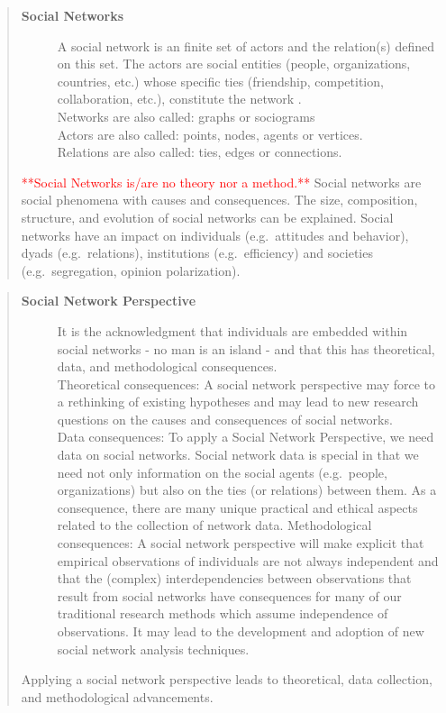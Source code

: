 \documentclass[
]{book}
\begin{document}
\begin{quote}
\begin{description}
\item[\textbf{Social Networks}]
A social network is an finite set of actors and the relation(s) defined on this set. The actors are social entities (people, organizations, countries, etc.) whose specific ties (friendship, competition, collaboration, etc.), constitute the network \citep[ : 20]{Wasserman1994}.\\
Networks are also called: graphs or sociograms\\
Actors are also called: points, nodes, agents or vertices.\\
Relations are also called: ties, edges or connections.
\end{description}

\textcolor{red}{**Social Networks is/are no theory nor a method.**} Social networks are social phenomena with causes and consequences. The size, composition, structure, and evolution of social networks can be explained. Social networks have an impact on individuals (e.g.~attitudes and behavior), dyads (e.g.~relations), institutions (e.g.~efficiency) and societies (e.g.~segregation, opinion polarization).
\end{quote}

\begin{quote}
\begin{description}
\item[\textbf{Social Network Perspective}]
It is the acknowledgment that individuals are embedded within social networks - no man is an island - and that this has theoretical, data, and methodological consequences.\\
Theoretical consequences: A social network perspective may force to a rethinking of existing hypotheses and may lead to new research questions on the causes and consequences of social networks.\\
Data consequences: To apply a Social Network Perspective, we need data on social networks. Social network data is special in that we need not only information on the social agents (e.g.~people, organizations) but also on the ties (or relations) between them. As a consequence, there are many unique practical and ethical aspects related to the collection of network data. Methodological consequences: A social network perspective will make explicit that empirical observations of individuals are not always independent and that the (complex) interdependencies between observations that result from social networks have consequences for many of our traditional research methods which assume independence of observations. It may lead to the development and adoption of new social network analysis techniques.
\end{description}

Applying a social network perspective leads to theoretical, data collection, and methodological advancements.
\end{quote}
\end{document}
